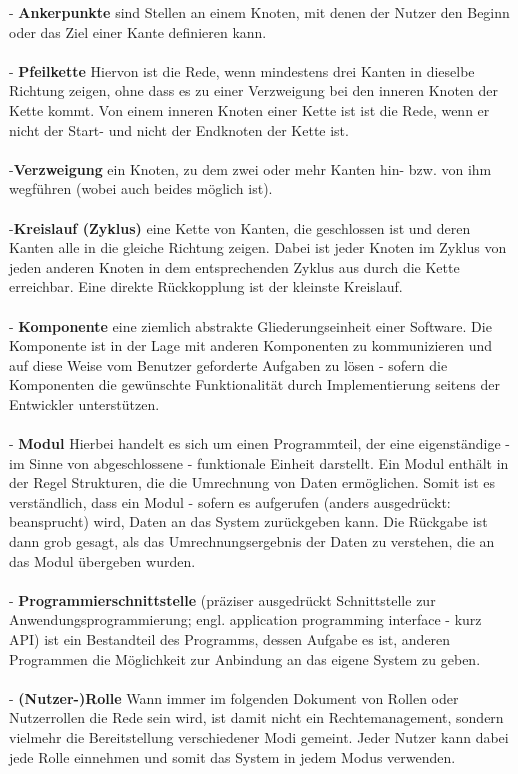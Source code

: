 \documentclass[enabledeprecatedfontcommands,fontsize=11pt,paper=a4,twoside]{scrartcl}
\newcounter{one}
\begin{document}
- \textbf{Ankerpunkte}  sind Stellen an einem Knoten, mit denen der Nutzer den Beginn oder das Ziel einer Kante definieren kann. \\ \\
- \textbf{Pfeilkette} Hiervon ist die Rede, wenn mindestens drei Kanten in dieselbe Richtung zeigen, ohne dass es zu einer Verzweigung bei den inneren Knoten der Kette kommt. Von einem inneren Knoten einer Kette ist ist die Rede, wenn er nicht der Start- und nicht der Endknoten der Kette ist. \\ \\
-\textbf{Verzweigung} ein Knoten, zu dem zwei oder mehr Kanten hin- bzw. von ihm wegführen (wobei auch beides möglich ist). \\ \\
-\textbf{\hypertarget{Kreislauf}{Kreislauf (Zyklus)}} eine Kette von Kanten, die geschlossen ist und deren Kanten alle in die gleiche Richtung zeigen. Dabei ist jeder Knoten im Zyklus von jeden anderen Knoten in dem entsprechenden Zyklus aus durch die Kette erreichbar. Eine direkte Rückkopplung ist der kleinste Kreislauf. \\ \\
- \textbf{Komponente} eine ziemlich abstrakte Gliederungseinheit einer Software. Die Komponente ist in der Lage mit anderen Komponenten zu kommunizieren und auf diese Weise vom Benutzer geforderte Aufgaben zu lösen - sofern die Komponenten die gewünschte Funktionalität durch Implementierung seitens der Entwickler unterstützen. \\ \\
- \textbf{Modul} Hierbei handelt es sich um einen Programmteil, der eine eigenständige - im Sinne von abgeschlossene - funktionale Einheit darstellt. Ein Modul enthält in der Regel Strukturen, die die Umrechnung von Daten ermöglichen. Somit ist es verständlich, dass ein Modul - sofern es aufgerufen (anders ausgedrückt: beansprucht) wird, Daten an das System zurückgeben kann. Die Rückgabe ist dann grob gesagt, als das Umrechnungsergebnis der Daten zu verstehen, die an das Modul übergeben wurden. \\ \\
- \textbf{Programmierschnittstelle} (präziser ausgedrückt Schnittstelle zur Anwendungsprogrammierung; engl. application programming interface - kurz API) ist ein Bestandteil des Programms, dessen Aufgabe es ist, anderen Programmen die Möglichkeit zur Anbindung an das eigene System zu geben.\\ \\
- \textbf{(Nutzer-)Rolle} Wann immer im folgenden Dokument von Rollen oder Nutzerrollen die Rede sein wird, ist damit nicht ein Rechtemanagement, sondern vielmehr die Bereitstellung verschiedener Modi gemeint. Jeder Nutzer kann dabei jede Rolle einnehmen und somit das System in jedem Modus verwenden. \\ \\
\end{document}
